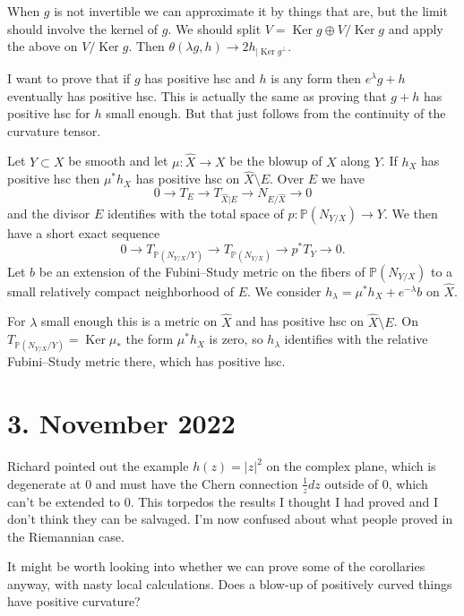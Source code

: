 \documentclass[11pt]{amsart}
\theoremstyle{definition}
\newcommand{\kk}[1]{\mathbb{#1}}
\DeclareMathOperator{\Ker}{Ker}
\begin{document}
When $g$ is not invertible we can approximate it by things that are, but the
limit should involve the kernel of $g$.
We should split $V = \Ker g \oplus V / \Ker g$ and apply the above on $V / \Ker g$.
Then $\theta(\lambda g, h) \to 2 h_{| \Ker g^\perp}$.



\medskip

I want to prove that if $g$ has positive hsc and $h$ is any form then
$e^\lambda g + h$ eventually has positive hsc.
This is actually the same as proving that $g + h$ has positive hsc for $h$
small enough.
But that just follows from the continuity of the curvature tensor.



\medskip

Let $Y \subset X$ be smooth and let $\mu : \hat X \to X$ be the blowup of $X$
along $Y$.
If $h_X$ has positive hsc then $\mu^* h_X$ has positive hsc on $\hat X \setminus E$.
Over $E$ we have
$$
0 \longrightarrow
T_E \longrightarrow
T_{\hat X|E} \longrightarrow
N_{E/\hat X} \longrightarrow
0
$$
and
the divisor $E$ identifies with the total space of $p:\kk P(N_{Y/X}) \to Y$.
We then have a short exact sequence
$$
0 \longrightarrow
T_{\kk P(N_{Y/X}/Y)} \longrightarrow
T_{\kk P(N_{Y/X})} \longrightarrow
p^* T_{Y} \longrightarrow
0.
$$
Let $b$ be an extension of the Fubini--Study metric on the fibers of $\kk
P(N_{Y/X})$ to a small relatively compact neighborhood of $E$.
We consider $h_\lambda = \mu^* h_X + e^{-\lambda} b$ on $\hat X$.

For $\lambda$ small enough this is a metric on $\hat X$ and has positive hsc on
$\hat X \setminus E$.
On $T_{\kk P(N_{Y/X}/Y)} = \Ker \mu_*$ the form $\mu^* h_X$ is zero, so
$h_\lambda$ identifies with the relative Fubini--Study metric there, which has
positive hsc.






\section{3. November 2022}

Richard pointed out the example $h(z) = |z|^2$ on the complex plane, which is
degenerate at $0$ and must have the Chern connection $\frac 1z dz$ outside of
$0$, which can't be extended to $0$.
This torpedos the results I thought I had proved and I don't think they can be
salvaged.
I'm now confused about what people proved in the Riemannian case.

It might be worth looking into whether we can prove some of the corollaries
anyway, with nasty local calculations.
Does a blow-up of positively curved things have positive curvature?
\end{document}
